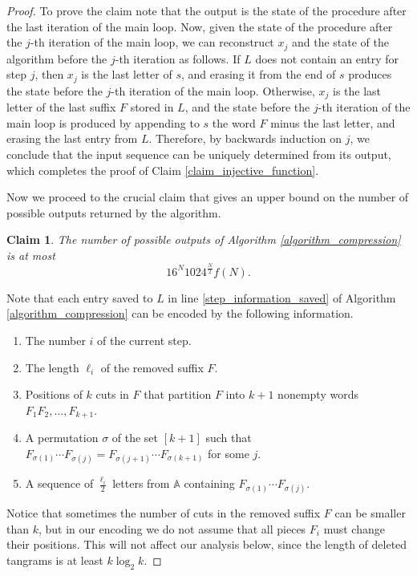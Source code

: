 \documentclass[12pt]{amsart}
\theoremstyle{plain}
\newtheorem{claim}{Claim}
\numberwithin{equation}{section}
\begin{document}
\begin{proof}
	To prove the claim note that the output is the state of the procedure after the last iteration of the main loop. Now, given the state of the procedure after the $j$-th iteration of the main loop, we can reconstruct $x_j$ and the state of the algorithm before the $j$-th iteration as follows. If $L$ does not contain an entry for step $j$, then $x_j$ is the last letter of $s$, and erasing it from the end of $s$ produces the state before the $j$-th iteration of the  main loop. Otherwise, $x_j$ is the last letter of the last suffix $F$ stored in $L$, and the state before the $j$-th iteration of the main loop is produced by appending to $s$ the word $F$ minus the last letter, and erasing the last entry from $L$. Therefore, by backwards induction on $j$, we conclude that the input sequence can be uniquely determined from its output, which completes the proof of Claim \ref{claim_injective_function}.
	
	Now we proceed to the crucial claim that gives an upper bound on the number of possible outputs returned by the algorithm.
	
	\begin{claim}
		\label{claim_number_of_outputs}
		The number of possible outputs of Algorithm \ref{algorithm_compression} is at most
		$$
		16^N 1024^{\frac{N}{2}}f(N).
		$$
	\end{claim}
	
	Note that each entry saved to $L$ in line \ref{step_information_saved} of Algorithm \ref{algorithm_compression} can be encoded by the following information.
	
	\begin{enumerate}
		\item The number $i$ of the current step.
		\item The length $\ell_i$ of the removed suffix $F$.
		\item Positions of $k$ cuts in $F$ that partition $F$ into $k+1$ nonempty words $F_1F_2, \ldots, F_{k+1}$.
		\item A permutation $\sigma$ of the set $[k+1]$ such that $F_{\sigma(1)}\cdots F_{\sigma(j)}=F_{\sigma(j+1)}\cdots F_{\sigma(k+1)}$ for some $j$.
		\item\label{loginfo_halves} A sequence of $\frac{\ell_i}{2}$ letters from $\mathbb{A}$ containing $F_{\sigma(1)}\cdots F_{\sigma(j)}$.
	\end{enumerate}

Notice that sometimes the number of cuts in the removed suffix $F$ can be smaller than $k$, but in our encoding we do not assume that all pieces $F_i$ must change their positions. This will not affect our analysis below, since the length of deleted tangrams is at least $k\log_2 k$.
	

\end{proof}
\end{document}
